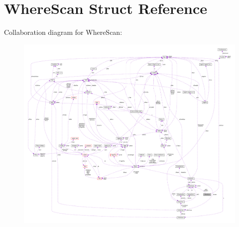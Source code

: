 \hypertarget{structWhereScan}{}\section{Where\+Scan Struct Reference}
\label{structWhereScan}


Collaboration diagram for Where\+Scan\+:\nopagebreak
\begin{figure}[H]
\begin{center}
\leavevmode
\includegraphics[width=350pt]{structWhereScan__coll__graph}
\end{center}
\end{figure}

